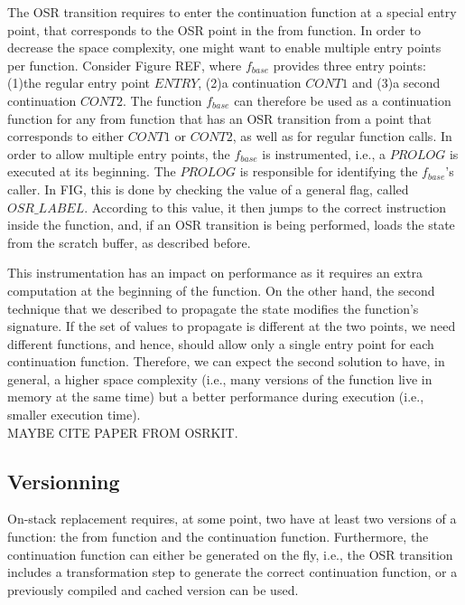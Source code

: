 The OSR transition requires to enter the continuation function at a special entry point, that corresponds to the OSR point in the from function.
In order to decrease the space complexity, one might want to enable multiple entry points per function.
Consider Figure REF, where $f_{base}$ provides three entry points: (1)the regular entry point $ENTRY$, (2)a continuation $CONT1$ and (3)a second continuation $CONT2$.
The function $f_{base}$ can therefore be used as a continuation function for any from function that has an OSR transition from a point that corresponds to either $CONT1$ or $CONT2$, as well as for regular function calls.
In order to allow multiple entry points, the $f_{base}$ is instrumented, i.e., a $PROLOG$ is executed at its beginning.
The $PROLOG$ is responsible for identifying the $f_{base}$'s caller. 
In FIG, this is done by checking the value of a general flag, called $OSR\_LABEL$.
According to this value, it then jumps to the correct instruction inside the function, and, if an OSR transition is being performed, loads the state from the scratch buffer, as described before.

This instrumentation has an impact on performance as it requires an extra computation at the beginning of the function. 
On the other hand, the second technique that we described to propagate the state modifies the function's signature.
If the set of values to propagate is different at the two points, we need different functions, and hence, should allow only a single entry point for each continuation function.
Therefore, we can expect the second solution to have, in general, a higher space complexity (i.e., many versions of the function live in memory at the same time) but a better performance during execution (i.e., smaller execution time).\\
MAYBE CITE PAPER FROM OSRKIT.

\subsection{Versionning}
On-stack replacement requires, at some point, two have at least two versions of a function: the from function and the continuation function.
Furthermore, the continuation function can either be generated on the fly, i.e., the OSR transition includes a transformation step to generate the correct continuation function, or a previously compiled and cached version can be used.

